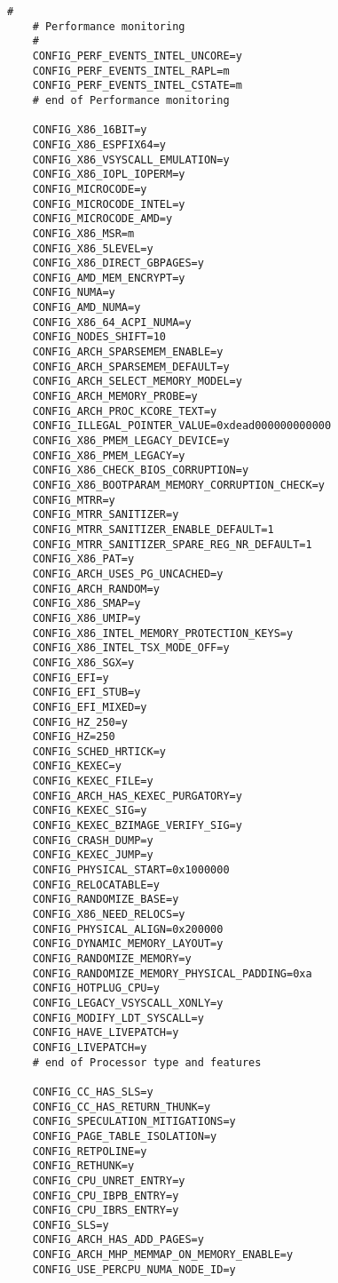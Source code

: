 \begin{multicols}{2}
\begin{lstlisting}[caption=kernel config,label=kconfig,]
    #
    # Performance monitoring
    #
    CONFIG_PERF_EVENTS_INTEL_UNCORE=y
    CONFIG_PERF_EVENTS_INTEL_RAPL=m
    CONFIG_PERF_EVENTS_INTEL_CSTATE=m
    # end of Performance monitoring
    
    CONFIG_X86_16BIT=y
    CONFIG_X86_ESPFIX64=y
    CONFIG_X86_VSYSCALL_EMULATION=y
    CONFIG_X86_IOPL_IOPERM=y
    CONFIG_MICROCODE=y
    CONFIG_MICROCODE_INTEL=y
    CONFIG_MICROCODE_AMD=y
    CONFIG_X86_MSR=m
    CONFIG_X86_5LEVEL=y
    CONFIG_X86_DIRECT_GBPAGES=y
    CONFIG_AMD_MEM_ENCRYPT=y
    CONFIG_NUMA=y
    CONFIG_AMD_NUMA=y
    CONFIG_X86_64_ACPI_NUMA=y
    CONFIG_NODES_SHIFT=10
    CONFIG_ARCH_SPARSEMEM_ENABLE=y
    CONFIG_ARCH_SPARSEMEM_DEFAULT=y
    CONFIG_ARCH_SELECT_MEMORY_MODEL=y
    CONFIG_ARCH_MEMORY_PROBE=y
    CONFIG_ARCH_PROC_KCORE_TEXT=y
    CONFIG_ILLEGAL_POINTER_VALUE=0xdead000000000000
    CONFIG_X86_PMEM_LEGACY_DEVICE=y
    CONFIG_X86_PMEM_LEGACY=y
    CONFIG_X86_CHECK_BIOS_CORRUPTION=y
    CONFIG_X86_BOOTPARAM_MEMORY_CORRUPTION_CHECK=y
    CONFIG_MTRR=y
    CONFIG_MTRR_SANITIZER=y
    CONFIG_MTRR_SANITIZER_ENABLE_DEFAULT=1
    CONFIG_MTRR_SANITIZER_SPARE_REG_NR_DEFAULT=1
    CONFIG_X86_PAT=y
    CONFIG_ARCH_USES_PG_UNCACHED=y
    CONFIG_ARCH_RANDOM=y
    CONFIG_X86_SMAP=y
    CONFIG_X86_UMIP=y
    CONFIG_X86_INTEL_MEMORY_PROTECTION_KEYS=y
    CONFIG_X86_INTEL_TSX_MODE_OFF=y
    CONFIG_X86_SGX=y
    CONFIG_EFI=y
    CONFIG_EFI_STUB=y
    CONFIG_EFI_MIXED=y
    CONFIG_HZ_250=y
    CONFIG_HZ=250
    CONFIG_SCHED_HRTICK=y
    CONFIG_KEXEC=y
    CONFIG_KEXEC_FILE=y
    CONFIG_ARCH_HAS_KEXEC_PURGATORY=y
    CONFIG_KEXEC_SIG=y
    CONFIG_KEXEC_BZIMAGE_VERIFY_SIG=y
    CONFIG_CRASH_DUMP=y
    CONFIG_KEXEC_JUMP=y
    CONFIG_PHYSICAL_START=0x1000000
    CONFIG_RELOCATABLE=y
    CONFIG_RANDOMIZE_BASE=y
    CONFIG_X86_NEED_RELOCS=y
    CONFIG_PHYSICAL_ALIGN=0x200000
    CONFIG_DYNAMIC_MEMORY_LAYOUT=y
    CONFIG_RANDOMIZE_MEMORY=y
    CONFIG_RANDOMIZE_MEMORY_PHYSICAL_PADDING=0xa
    CONFIG_HOTPLUG_CPU=y
    CONFIG_LEGACY_VSYSCALL_XONLY=y
    CONFIG_MODIFY_LDT_SYSCALL=y
    CONFIG_HAVE_LIVEPATCH=y
    CONFIG_LIVEPATCH=y
    # end of Processor type and features
    
    CONFIG_CC_HAS_SLS=y
    CONFIG_CC_HAS_RETURN_THUNK=y
    CONFIG_SPECULATION_MITIGATIONS=y
    CONFIG_PAGE_TABLE_ISOLATION=y
    CONFIG_RETPOLINE=y
    CONFIG_RETHUNK=y
    CONFIG_CPU_UNRET_ENTRY=y
    CONFIG_CPU_IBPB_ENTRY=y
    CONFIG_CPU_IBRS_ENTRY=y
    CONFIG_SLS=y
    CONFIG_ARCH_HAS_ADD_PAGES=y
    CONFIG_ARCH_MHP_MEMMAP_ON_MEMORY_ENABLE=y
    CONFIG_USE_PERCPU_NUMA_NODE_ID=y
    

\end{lstlisting}
\end{multicols}
